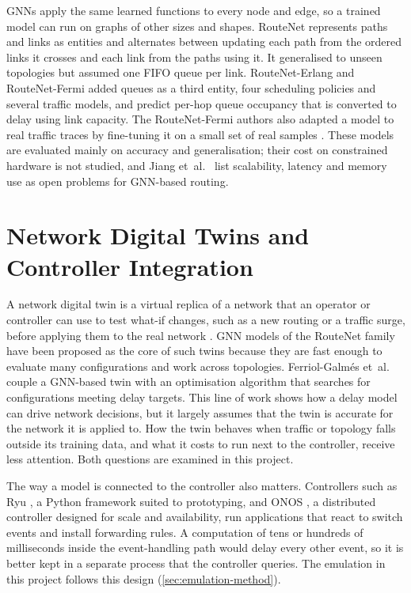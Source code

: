 GNNs \cite{scarselli2009gnn,gilmer2017mpnn,battaglia2018relational} apply the same learned functions to every node and edge, so a trained model can run on graphs of other sizes and shapes. RouteNet \cite{rusek2020routenet} represents paths and links as entities and alternates between updating each path from the ordered links it crosses and each link from the paths using it. It generalised to unseen topologies but assumed one FIFO queue per link. RouteNet-Erlang \cite{ferriolgalmes2022routeneterlang} and RouteNet-Fermi \cite{ferriolgalmes2023routenetfermi} added queues as a third entity, four scheduling policies and several traffic models, and predict per-hop queue occupancy that is converted to delay using link capacity. The RouteNet-Fermi authors also adapted a model to real traffic traces by fine-tuning it on a small set of real samples \cite{ferriolgalmes2023routenetfermi}. These models are evaluated mainly on accuracy and generalisation; their cost on constrained hardware is not studied, and Jiang et~al.\ \cite{jiang2024gnnrouting} list scalability, latency and memory use as open problems for GNN-based routing.

\section{Network Digital Twins and Controller Integration}

A network digital twin is a virtual replica of a network that an operator or controller can use to test what-if changes, such as a new routing or a traffic surge, before applying them to the real network \cite{almasan2022ndt}. GNN models of the RouteNet family have been proposed as the core of such twins because they are fast enough to evaluate many configurations and work across topologies. Ferriol-Galm\'es et~al.\ \cite{ferriolgalmes2022digitaltwin} couple a GNN-based twin with an optimisation algorithm that searches for configurations meeting delay targets. This line of work shows how a delay model can drive network decisions, but it largely assumes that the twin is accurate for the network it is applied to. How the twin behaves when traffic or topology falls outside its training data, and what it costs to run next to the controller, receive less attention. Both questions are examined in this project.

The way a model is connected to the controller also matters. Controllers such as Ryu \cite{ryu}, a Python framework suited to prototyping, and ONOS \cite{berde2014onos}, a distributed controller designed for scale and availability, run applications that react to switch events and install forwarding rules. A computation of tens or hundreds of milliseconds inside the event-handling path would delay every other event, so it is better kept in a separate process that the controller queries. The emulation in this project follows this design (\cref{sec:emulation-method}).

